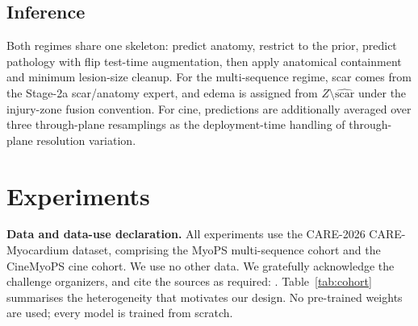 \documentclass[runningheads]{llncs}
\begin{document}
\subsection{Inference}

Both regimes share one skeleton: predict anatomy, restrict to the prior, predict
pathology with flip test-time augmentation, then apply anatomical containment and
minimum lesion-size cleanup.
For the multi-sequence regime, scar comes from the Stage-2a scar/anatomy expert,
and edema is assigned from $Z\setminus\widehat{\text{scar}}$ under the injury-zone
fusion convention. For cine, predictions are additionally averaged over three
through-plane resamplings as the deployment-time handling of through-plane
resolution variation.

\section{Experiments}
\label{sec:exp}

\noindent\textbf{Data and data-use declaration.} All experiments use the
CARE-2026 CARE-Myocardium dataset, comprising the MyoPS multi-sequence cohort
and the CineMyoPS cine cohort. We use no other data. We gratefully acknowledge
the challenge organizers, and cite the sources as required:
\cite{zhuang2019multivariate,qiu2023myopsnet,ding2023aligning,ding2025cinemyops}.
Table~\ref{tab:cohort} summarises the heterogeneity that motivates our design.
No pre-trained weights are used; every model is trained from scratch.
\end{document}

